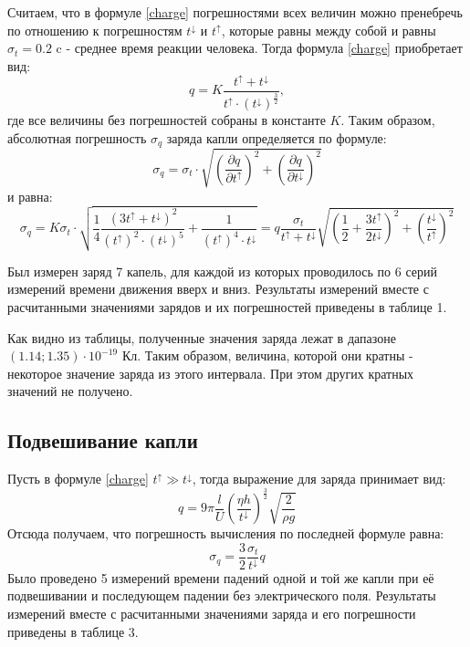 \documentclass[14pt, a4paper,reqno]{article}
\begin{document}
        Считаем, что в формуле \eqref{charge} погрешностями всех величин можно пренебречь по отношению
        к погрешностям $t^{\downarrow}$ и $t^{\uparrow}$, которые равны между собой и равны $\sigma_t = 0.2$ c -
        среднее время реакции человека. Тогда формула \eqref{charge} приобретает вид:
        \begin{equation*}
            q = K\frac{t^{\uparrow} + t^{\downarrow}}{t^{\uparrow} \cdot (t^{\downarrow})^{\frac{3}{2}}},
        \end{equation*}
        где все величины без погрешностей собраны в константе $K$. Таким образом, абсолютная погрешность
        $\sigma_q$ заряда капли определяется по формуле:
        \begin{equation*}
            \sigma_q = \sigma_t \cdot \sqrt{\left(\frac{\partial q}{\partial t^{\uparrow}}\right)^2 + \left(\frac{\partial q}{\partial t^{\downarrow}}\right)^2}
        \end{equation*}
        и равна:
        \begin{equation*}
            \sigma_q = K\sigma_t \cdot \sqrt{\frac{1}{4}\frac{(3t^{\uparrow} + t^{\downarrow})^2}{(t^{\uparrow})^2 \cdot (t^{\downarrow})^5} + \frac{1}{(t^{\uparrow})^4 \cdot t^{\downarrow}}} =
            q \frac{\sigma_t}{t^{\uparrow} + t^{\downarrow}} \sqrt{\left(\frac{1}{2} + \frac{3t^{\uparrow}}{2t^{\downarrow}}\right)^2 + \left(\frac{t^{\downarrow}}{t^{\uparrow}}\right)^2}
        \end{equation*}

        Был измерен заряд 7 капель, для каждой из которых проводилось по 6 серий измерений времени
        движения вверх и вниз. Результаты измерений вместе с расчитанными значениями зарядов и их
        погрешностей приведены в таблице 1.

        Как видно из таблицы, полученные значения заряда лежат в дапазоне $(1.14; 1.35)\cdot 10^{-19}$ Кл.
        Таким образом, величина, которой они кратны - некоторое значение заряда из этого интервала. При этом
        других кратных значений не получено.

    \subsection{Подвешивание капли}

        Пусть в формуле \eqref{charge} $t^{\uparrow} \gg t^{\downarrow}$, тогда выражение для заряда
        принимает вид:
        \begin{equation*}
            q = 9\pi\frac{l}{U}\left(\frac{\eta h}{t^{\downarrow}}\right)^{\frac{3}{2}} \sqrt{\frac{2}{\rho g}}
        \end{equation*}
        Отсюда получаем, что погрешность вычисления по последней формуле равна:
        \begin{equation*}
            \sigma_q = \frac{3}{2}\frac{\sigma_t}{t^{\downarrow}}q
        \end{equation*}
        Было проведено 5 измерений времени падений одной и той же капли при её подвешивании и 
        последующем падении без электрического поля. Результаты измерений вместе с расчитанными 
        значениями заряда и его погрешности приведены в таблице 3.
\end{document}
